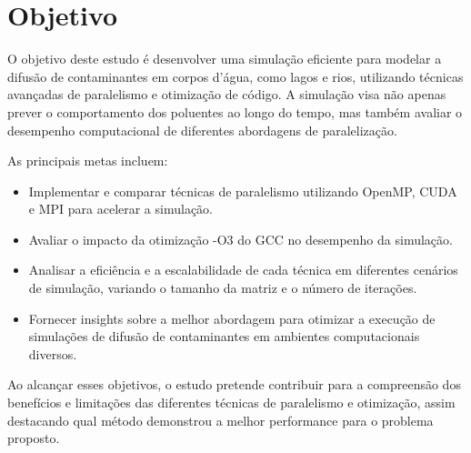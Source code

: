 \section{Objetivo}

O objetivo deste estudo é desenvolver uma simulação eficiente para modelar a difusão de contaminantes em corpos d'água, como lagos e rios, utilizando técnicas avançadas de paralelismo e otimização de código. A simulação visa não apenas prever o comportamento dos poluentes ao longo do tempo, mas também avaliar o desempenho computacional de diferentes abordagens de paralelização.

As principais metas incluem:

\begin{itemize}
    \item Implementar e comparar técnicas de paralelismo utilizando OpenMP, CUDA e MPI para acelerar a simulação.
    \item Avaliar o impacto da otimização -O3 do GCC no desempenho da simulação.
    \item Analisar a eficiência e a escalabilidade de cada técnica em diferentes cenários de simulação, variando o tamanho da matriz e o número de iterações.
    \item Fornecer insights sobre a melhor abordagem para otimizar a execução de simulações de difusão de contaminantes em ambientes computacionais diversos.
\end{itemize}

Ao alcançar esses objetivos, o estudo pretende contribuir para a compreensão dos benefícios e limitações das diferentes técnicas de paralelismo e otimização, assim destacando qual método demonstrou a melhor performance para o problema proposto.
